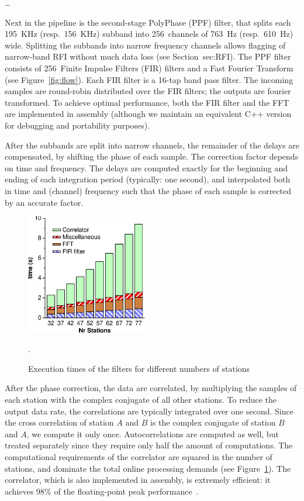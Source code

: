 \documentclass[journal]{IEEEtran}
\begin{document}
\ldots

Next in the pipeline is the second-stage PolyPhase (PPF) filter, that splits
each 195~KHz (resp.\ 156~KHz) subband into 256~channels of 763~Hz
(resp.\ 610~Hz) wide.
Splitting the subbands into narrow frequency channels allows flagging
of narrow-band RFI without much data loss (see Section~{sec:RFI}).
The PPF filter consists of 256~Finite Impulse Filters (FIR) filters and a
Fast Fourier Transform (see Figure~\ref{fig:flow}).
Each FIR filter is a 16-tap band pass filter.
The incoming samples are round-robin distributed over the FIR filters;
the outputs are fourier transformed.
To achieve optimal performance, both the FIR filter and the FFT are implemented
in assembly (although we maintain an equivalent C++ version for debugging
and portability purposes).

After the subbands are split into narrow channels, the remainder of the
delays are compensated, by shifting the phase of each sample.
The correction factor depends on time and frequency.
The delays are computed exactly for the beginning and ending of each
integration period (typically: one second), and interpolated both in time
and (channel) frequency such that the phase of each sample is corrected by
an accurate factor.

\begin{figure}
\begin{center}
\includegraphics[width=53mm]{speed}
\end{center}
\caption{Execution times of the filters for different numbers of stations}.
\label{fig:speed}
\end{figure}

After the phase correction, the data are correlated, by multiplying the
samples of each station with the complex conjugate of all other stations.
To reduce the output data rate, the correlations are typically integrated
over one second.
Since the cross correlation of station $A$ and $B$ is the complex conjugate
of station $B$ and $A$, we compute it only once.
Autocorrelations are computed as well, but treated separately since they
require only half the amount of computations.
The computational requirements of the correlator are squared in the number
of stations, and dominate the total online processing demands (see
Figure~\ref{fig:speed}).
The correlator, which is also implemented in assembly, is extremely efficient:
it achieves 98\% of the floating-point peak performance~\cite{Romein:06}.
\end{document}
